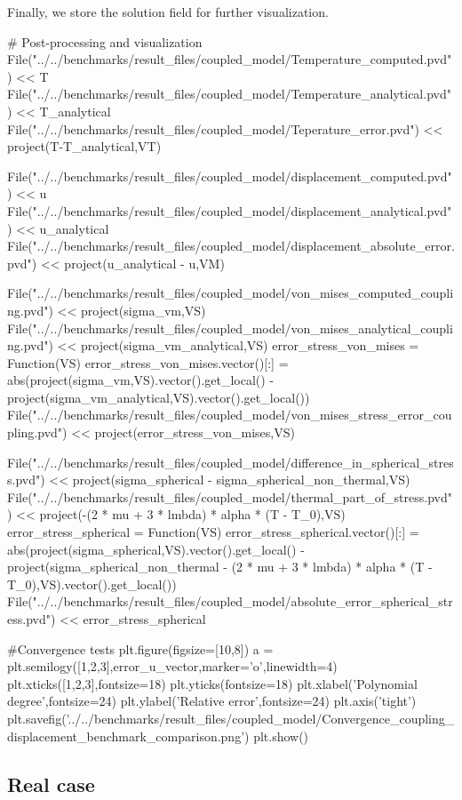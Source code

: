 Finally, we store the solution field for further visualization.
\begin{python}
# Post-processing and visualization
File("../../benchmarks/result_files/coupled_model/Temperature_computed.pvd") << T
File("../../benchmarks/result_files/coupled_model/Temperature_analytical.pvd") << T_analytical
File("../../benchmarks/result_files/coupled_model/Teperature_error.pvd") << project(T-T_analytical,VT)

File("../../benchmarks/result_files/coupled_model/displacement_computed.pvd") << u
File("../../benchmarks/result_files/coupled_model/displacement_analytical.pvd") << u_analytical
File("../../benchmarks/result_files/coupled_model/displacement_absolute_error.pvd") << project(u_analytical - u,VM)

File("../../benchmarks/result_files/coupled_model/von_mises_computed_coupling.pvd") << project(sigma_vm,VS)
File("../../benchmarks/result_files/coupled_model/von_mises_analytical_coupling.pvd") << project(sigma_vm_analytical,VS)
error_stress_von_mises = Function(VS)
error_stress_von_mises.vector()[:] = abs(project(sigma_vm,VS).vector().get_local() - project(sigma_vm_analytical,VS).vector().get_local())
File("../../benchmarks/result_files/coupled_model/von_mises_stress_error_coupling.pvd") << project(error_stress_von_mises,VS)

File("../../benchmarks/result_files/coupled_model/difference_in_spherical_stress.pvd") << project(sigma_spherical - sigma_spherical_non_thermal,VS)
File("../../benchmarks/result_files/coupled_model/thermal_part_of_stress.pvd") << project(-(2 * mu + 3 * lmbda) * alpha * (T - T_0),VS)
error_stress_spherical = Function(VS)
error_stress_spherical.vector()[:] = abs(project(sigma_spherical,VS).vector().get_local() - project(sigma_spherical_non_thermal - (2 * mu + 3 * lmbda) * alpha * (T - T_0),VS).vector().get_local())
File("../../benchmarks/result_files/coupled_model/absolute_error_spherical_stress.pvd") << error_stress_spherical

#Convergence tests
plt.figure(figsize=[10,8])
a = plt.semilogy([1,2,3],error_u_vector,marker='o',linewidth=4)
plt.xticks([1,2,3],fontsize=18)
plt.yticks(fontsize=18)
plt.xlabel('Polynomial degree',fontsize=24)
plt.ylabel('Relative error',fontsize=24)
plt.axis('tight')
plt.savefig('../../benchmarks/result_files/coupled_model/Convergence_coupling_displacement_benchmark_comparison.png')
plt.show()
\end{python}

\subsection{Real case}

